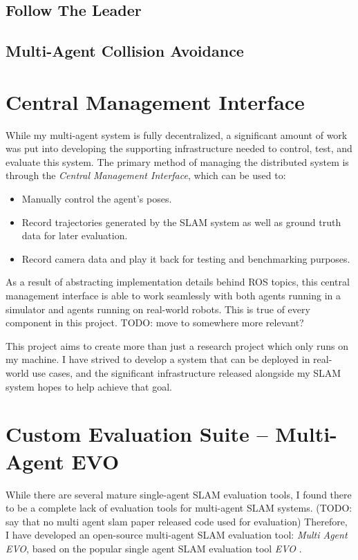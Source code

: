 \subsection{Follow The Leader}
\label{sec:follow-the-leader}

\subsection{Multi-Agent Collision Avoidance}
\label{sec:multi-agent-collision-avoidance}

\section{Central Management Interface}
\label{sec:central-management-interface}
While my multi-agent system is fully decentralized, a significant amount of work was put into developing the supporting infrastructure needed to control, test, and evaluate this system. The primary method of managing the distributed system is through the \textit{Central Management Interface}, which can be used to: \noparskip
\smallbreak
{
    \begin{itemize}[noitemsep]
        \item Manually control the agent's poses.
        \item Record trajectories generated by the SLAM system as well as ground truth data for later evaluation.
        \item Record camera data and play it back for testing and benchmarking purposes.
    \end{itemize}
}

As a result of abstracting implementation details behind ROS topics, this central management interface is able to work seamlessly with both agents running in a simulator and agents running on real-world robots. This is true of every component in this project. TODO: move to somewhere more relevant?

This project aims to create more than just a research project which only runs on my machine. I have strived to develop a system that can be deployed in real-world use cases, and the significant infrastructure released alongside my SLAM system hopes to help achieve that goal.

\section{Custom Evaluation Suite – Multi-Agent EVO}
\label{sec:multi-agent-evo}
While there are several mature single-agent SLAM evaluation tools, I found there to be a complete lack of evaluation tools for multi-agent SLAM systems. (TODO: say that no multi agent slam paper released code used for evaluation) Therefore, I have developed an open-source multi-agent SLAM evaluation tool: \textit{Multi Agent EVO}, based on the popular single agent SLAM evaluation tool \textit{EVO} \autocite{grupp2017evo}.


